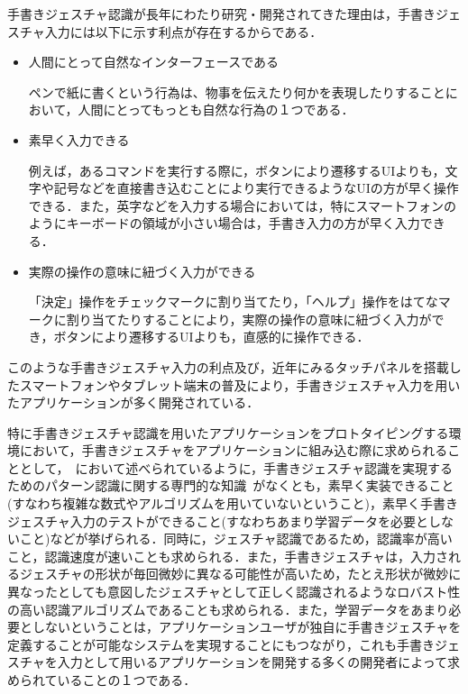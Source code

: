 手書きジェスチャ認識が長年にわたり研究・開発されてきた理由は，手書きジェスチャ入力には以下に示す利点が存在するからである．
\begin{itemize}
 \item 人間にとって自然なインターフェースである
 
ペンで紙に書くという行為は、物事を伝えたり何かを表現したりすることにおいて，人間にとってもっとも自然な行為の１つである．
 \item 素早く入力できる
 
例えば，あるコマンドを実行する際に，ボタンにより遷移するUIよりも，文字や記号などを直接書き込むことにより実行できるようなUIの方が早く操作できる．また，英字などを入力する場合においては，特にスマートフォンのようにキーボードの領域が小さい場合は，手書き入力の方が早く入力できる．
 \item 実際の操作の意味に紐づく入力ができる
 
 「決定」操作をチェックマークに割り当てたり，「ヘルプ」操作をはてなマークに割り当てたりすることにより，実際の操作の意味に紐づく入力ができ，ボタンにより遷移するUIよりも，直感的に操作できる．
\end{itemize}

このような手書きジェスチャ入力の利点及び，近年にみるタッチパネルを搭載したスマートフォンやタブレット端末の普及により，手書きジェスチャ入力を用いたアプリケーションが多く開発されている．

特に手書きジェスチャ認識を用いたアプリケーションをプロトタイピングする環境において，手書きジェスチャをアプリケーションに組み込む際に求められることとして，~\cite{Rettig:1994:PTF:175276.175288}において述べられているように，手書きジェスチャ認識を実現するためのパターン認識に関する専門的な知識~\cite{Hong00constructingfinite, Anderson2004HiddenMM,Sezgin:2005:HES:1040830.1040899, Cao:2005:EOA:1089508.1089540, Pittman:1991:RHT:108844.108914, Cho:2006:NGR:1711617.1711649,Rubine:1991:SGE:127719.122753, Anthony:2010:LMR:1839214.1839258}がなくとも，素早く実装できること(すなわち複雑な数式やアルゴリズムを用いていないということ)，素早く手書きジェスチャ入力のテストができること(すなわちあまり学習データを必要としないこと)などが挙げられる．同時に，ジェスチャ認識であるため，認識率が高いこと，認識速度が速いことも求められる．また，手書きジェスチャは，入力されるジェスチャの形状が毎回微妙に異なる可能性が高いため，たとえ形状が微妙に異なったとしても意図したジェスチャとして正しく認識されるようなロバスト性の高い認識アルゴリズムであることも求められる．また，学習データをあまり必要としないということは，アプリケーションユーザが独自に手書きジェスチャを定義することが可能なシステムを実現することにもつながり，これも手書きジェスチャを入力として用いるアプリケーションを開発する多くの開発者によって求められていることの１つである．

